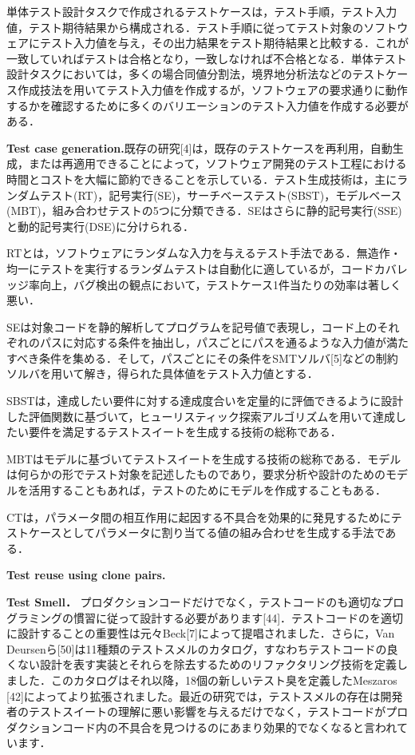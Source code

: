\documentclass[conference]{IEEEtran}
\begin{document}
単体テスト設計タスクで作成されるテストケースは，テスト手順，テスト入力値，テスト期待結果から構成される．テスト手順に従ってテスト対象のソフトウェアにテスト入力値を与え，その出力結果をテスト期待結果と比較する．これが一致していればテストは合格となり，一致しなければ不合格となる．単体テスト設計タスクにおいては，多くの場合同値分割法，境界地分析法などのテストケース作成技法を用いてテスト入力値を作成するが，ソフトウェアの要求通りに動作するかを確認するために多くのバリエーションのテスト入力値を作成する必要がある．

\textbf{Test case generation.}既存の研究[4]は，既存のテストケースを再利用，自動生成，または再適用できることによって，ソフトウェア開発のテスト工程における時間とコストを大幅に節約できることを示している．テスト生成技術は，主にランダムテスト(RT)，記号実行(SE)，サーチベーステスト(SBST)，モデルベース(MBT)，組み合わせテストの5つに分類できる．SEはさらに静的記号実行(SSE)と動的記号実行(DSE)に分けられる．

RTとは，ソフトウェアにランダムな入力を与えるテスト手法である．無造作・均一にテストを実行するランダムテストは自動化に適しているが，コードカバレッジ率向上，バグ検出の観点において，テストケース1件当たりの効率は著しく悪い．

SEは対象コードを静的解析してプログラムを記号値で表現し，コード上のそれぞれのパスに対応する条件を抽出し，パスごとにパスを通るような入力値が満たすべき条件を集める．そして，パスごとにその条件をSMTソルバ[5]などの制約ソルバを用いて解き，得られた具体値をテスト入力値とする．

SBSTは，達成したい要件に対する達成度合いを定量的に評価できるように設計した評価関数に基づいて，ヒューリスティック探索アルゴリズムを用いて達成したい要件を満足するテストスイートを生成する技術の総称である．

MBTはモデルに基づいてテストスイートを生成する技術の総称である．モデルは何らかの形でテスト対象を記述したものであり，要求分析や設計のためのモデルを活用することもあれば，テストのためにモデルを作成することもある．

CTは，パラメータ間の相互作用に起因する不具合を効果的に発見するためにテストケースとしてパラメータに割り当てる値の組み合わせを生成する手法である．

\textbf{Test reuse using clone pairs.}

\textbf{Test Smell．}
プロダクションコードだけでなく，テストコードのも適切なプログラミングの慣習に従って設計する必要があります[44]．テストコードのを適切に設計することの重要性は元々Beck[7]によって提唱されました．さらに，Van Deursenら[50]は11種類のテストスメルのカタログ，すなわちテストコードの良くない設計を表す実装とそれらを除去するためのリファクタリング技術を定義しました．このカタログはそれ以降，18個の新しいテスト臭を定義したMeszaros [42]によってより拡張されました。最近の研究では，テストスメルの存在は開発者のテストスイートの理解に悪い影響を与えるだけでなく，テストコードがプロダクションコード内の不具合を見つけるのにあまり効果的でなくなると言われています．
\end{document}
